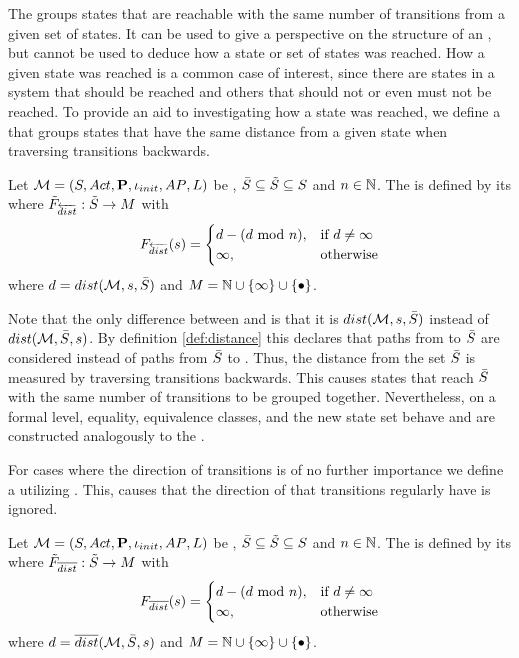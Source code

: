 \documentclass[preview]{standalone}
\begin{document}
The \viewN \viewdistance groups states that are reachable with the same number of transitions from a given set of states. It can be used to give a perspective on the structure of an \mdpN, but cannot be used to deduce how a state or set of states was reached. How a given state was reached is a common case of interest, since there are states in a system that should be reached and others that should not or even must not be reached. To provide an aid to investigating how a state was reached, we define a \viewN that groups states that have the same distance from a given state when traversing transitions backwards.

\begin{definition}
	Let ${{{\mathcal{M}}}} = {{({S}, {Act}, {\textbf{P}}, {\iota_{init}}, {AP}, {L})}}$ be \achgphN, $\bar{{S}} \subseteq {\tilde{\ensuremath{{S}}}} \subseteq {S}$ and $n \in {\mathbb{N}}$. The \viewN \viewdistancerev is defined by its \grpfctN \gfctdistancerev where $\gfctsubdistancerev : \smstates \to \imggrp$ with 
	\[
	\gfctdistancerev(\state) =
	\begin{cases}
		\distval - (\distval \text{ mod } n), &\text{if } d \neq \infty \\
		\infty, &\text{otherwise}
	\end{cases}		
	\]
	where ${d} = {dist}({{{\mathcal{M}}}},{s},\bar{{S}})$ and $\imggrp = \natnums \cup \{\infty\} \cup \remset$.
\end{definition}

Note that the only difference between \viewdistancerev and \viewdistance is that it is ${dist}({{{\mathcal{M}}}},{s},\bar{{S}})$ instead of ${dist}({{{\mathcal{M}}}},\bar{{S}}, {s})$. By definition \ref{def:distance} this declares that paths from \state to $\bar{{S}}$ are considered instead of paths from $\bar{{S}}$ to \state. Thus, the distance from the set $\bar{{S}}$ is measured by traversing transitions backwards. This causes states that reach $\bar{{S}}$ with the same number of transitions to be grouped together. Nevertheless, on a formal level, equality, equivalence classes, and the new state set behave and are constructed analogously to the \viewN \viewdistance.

For cases where the direction of transitions is of no further importance we define a \viewN \viewdistancebi utilizing \distpathbi. This, causes that the direction of that transitions regularly have is ignored.

\begin{definition}
	Let ${{{\mathcal{M}}}} = {{({S}, {Act}, {\textbf{P}}, {\iota_{init}}, {AP}, {L})}}$ be \achgphN, $\bar{{S}} \subseteq {\tilde{\ensuremath{{S}}}} \subseteq {S}$ and $n \in {\mathbb{N}}$. The \viewN \viewdistancebi is defined by its \grpfctN \gfctdistancebi where ${{\tilde{F}_{{{\overline{dist}}}}}} : {\tilde{{S}}} \to {\ensuremath{{M}}}$ with 
	\[
	{{F_{{{\overline{dist}}}}}}({s}) =
	\begin{cases}
		{d} - ({d} \text{ mod } n), &\text{if } d \neq \infty \\
		\infty, &\text{otherwise}
	\end{cases}		
	\]
	where ${d} = {\overline{dist}}({{{\mathcal{M}}}},\bar{{S}}, {s})$ and $\imggrp = \natnums \cup \{\infty\} \cup \remset$.
\end{definition}
\end{document}
